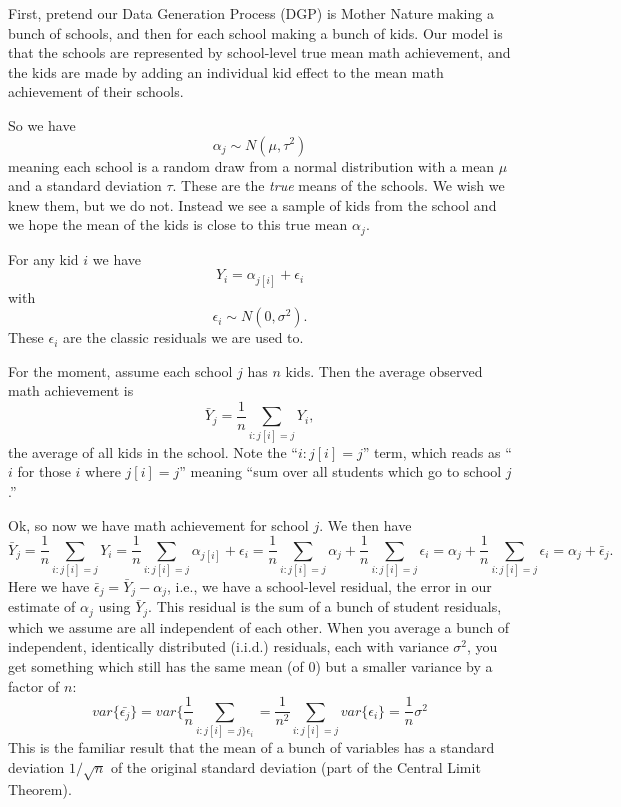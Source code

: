 \documentclass[
  letterpaper,
  DIV=11,
  numbers=noendperiod]{scrreprt}
\begin{document}
First, pretend our Data Generation Process (DGP) is Mother Nature making
a bunch of schools, and then for each school making a bunch of kids. Our
model is that the schools are represented by school-level true mean math
achievement, and the kids are made by adding an individual kid effect to
the mean math achievement of their schools.

So we have \[\alpha_j \sim N( \mu, \tau^2 )\] meaning each school is a
random draw from a normal distribution with a mean \(\mu\) and a
standard deviation \(\tau\). These are the \emph{true} means of the
schools. We wish we knew them, but we do not. Instead we see a sample of
kids from the school and we hope the mean of the kids is close to this
true mean \(\alpha_j\).

For any kid \(i\) we have \[Y_i  = \alpha_{j[i]} + \epsilon_i\] with
\[\epsilon_i \sim N( 0, \sigma^2 ).\] These \(\epsilon_i\) are the
classic residuals we are used to.

For the moment, assume each school \(j\) has \(n\) kids. Then the
average observed math achievement is
\[\bar{Y}_j = \frac{1}{n} \sum_{i : j[i] = j} Y_i ,\] the average of all
kids in the school. Note the ``\(i : j[i] = j\)'' term, which reads as
``\(i\) for those \(i\) where \(j[i] = j\)'' meaning ``sum over all
students which go to school \(j\).''

Ok, so now we have math achievement for school \(j\). We then have
\[\bar{Y}_j = \frac{1}{n} \sum_{i : j[i] = j} Y_i  = \frac{1}{n} \sum_{i : j[i] = j} \alpha_{j[i]} + \epsilon_i =   \frac{1}{n} \sum_{i : j[i] = j} \alpha_j +  \frac{1}{n} \sum_{i : j[i] = j} \epsilon_i = \alpha_j +  \frac{1}{n} \sum_{i : j[i] = j}\epsilon_i = \alpha_j + \bar{\epsilon}_j .\]
Here we have \(\bar{\epsilon}_j = \bar{Y}_j - \alpha_j\), i.e., we have
a school-level residual, the error in our estimate of \(\alpha_j\) using
\(\bar{Y}_j\). This residual is the sum of a bunch of student residuals,
which we assume are all independent of each other. When you average a
bunch of independent, identically distributed (i.i.d.) residuals, each
with variance \(\sigma^2\), you get something which still has the same
mean (of 0) but a smaller variance by a factor of \(n\):
\[var\{ \bar{\epsilon_j} \} = var\{  \frac{1}{n} \sum_{i : j[i] = j\}\epsilon_i } = \frac{1}{n^2} \sum_{i : j[i] = j} var\{ \epsilon_i \} =  \frac{1}{n} \sigma^2\]
This is the familiar result that the mean of a bunch of variables has a
standard deviation \(1/\sqrt{n}\) of the original standard deviation
(part of the Central Limit Theorem).
\end{document}
